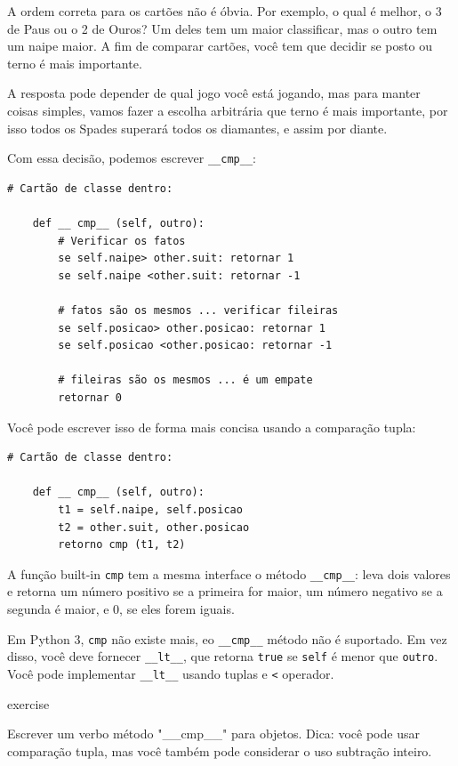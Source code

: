 \documentclass[10pt]{book}
\begin{document}
\begin{exercise}
\begin{v erbatim}
A ordem correta para os cartões não é óbvia.
Por exemplo, o qual
é melhor, o 3 de Paus ou o 2 de Ouros? Um deles tem um maior
classificar, mas o outro tem um naipe maior. A fim de comparar
cartões, você tem que decidir se posto ou terno é mais importante.

A resposta pode depender de qual jogo você está jogando, mas para manter
coisas simples, vamos fazer a escolha arbitrária que terno é mais
importante, por isso todos os Spades superará todos os diamantes,
e assim por diante.

Com essa decisão, podemos escrever \verb "__cmp__":

\begin{verbatim}
# Cartão de classe dentro:

    def __ cmp__ (self, outro):
        # Verificar os fatos
        se self.naipe> other.suit: retornar 1
        se self.naipe <other.suit: retornar -1

        # fatos são os mesmos ... verificar fileiras
        se self.posicao> other.posicao: retornar 1
        se self.posicao <other.posicao: retornar -1

        # fileiras são os mesmos ... é um empate
        retornar 0    
\end{verbatim}
%
Você pode escrever isso de forma mais concisa usando a comparação tupla:

\begin{verbatim}
# Cartão de classe dentro:

    def __ cmp__ (self, outro):
        t1 = self.naipe, self.posicao
        t2 = other.suit, other.posicao
        retorno cmp (t1, t2)
\end{verbatim}
%
A função built-in {\tt cmp} tem a mesma interface
o método \verb "__cmp__": leva dois valores e retorna
um número positivo se a primeira for maior, um número negativo
se a segunda é maior, e 0, se eles forem iguais.

Em Python 3, {\tt cmp} não existe mais, eo \verb "__cmp__"
método não é suportado. Em vez disso, você deve fornecer \verb "__lt__",
que retorna {\tt true} se {\tt self} é menor que {\tt outro}.
Você pode implementar \verb "__lt__" usando tuplas e \verb "<"
operador.

\begin{} exercise

Escrever um verbo método "__cmp__" \Tempo para objetos. Dica: você
pode usar comparação tupla, mas você também pode considerar o uso
subtração inteiro.


\end{}
\end{v erbatim}
\end{exercise}
\end{document}
